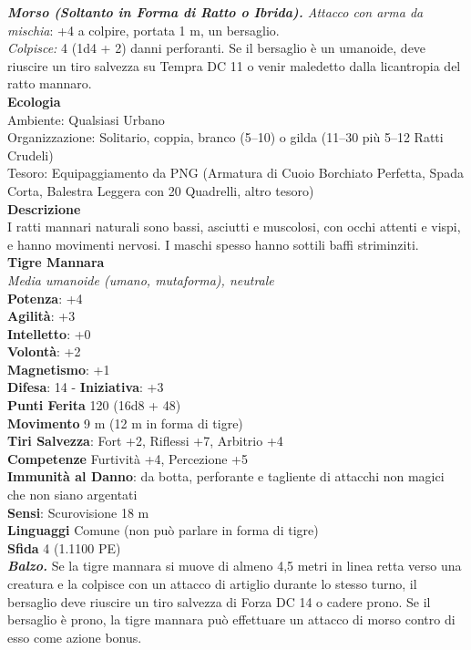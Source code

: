 \begin{multicols}{2}
\emph{\textbf{Morso (Soltanto in Forma di Ratto o Ibrida).} Attacco con arma da mischia}: +4 a colpire, portata 1 m, un bersaglio.\\

\emph{Colpisce:} 4 (1d4 + 2) danni perforanti. Se il bersaglio è un umanoide, deve riuscire un tiro salvezza su Tempra DC 11 o venir maledetto dalla licantropia del ratto mannaro.\\
\textbf{Ecologia}\\
Ambiente: Qualsiasi Urbano\\
Organizzazione: Solitario, coppia, branco (5–10) o gilda (11–30 più 5–12 Ratti Crudeli)\\
Tesoro: Equipaggiamento da PNG (Armatura di Cuoio Borchiato Perfetta, Spada Corta, Balestra Leggera con 20 Quadrelli, altro tesoro)\\
\textbf{Descrizione}\\
I ratti mannari naturali sono bassi, asciutti e muscolosi, con occhi attenti e vispi, e hanno movimenti nervosi. I maschi spesso hanno sottili baffi striminziti.\\

\medskip\textbf{Tigre Mannara}\\
\emph{Media umanoide (umano, mutaforma), neutrale}\\
\textbf{Potenza}: +4\\
\textbf{Agilità}: +3\\
\textbf{Intelletto}: +0\\
\textbf{Volontà}: +2\\
\textbf{Magnetismo}: +1\\
\textbf{Difesa}: 14 - \textbf{Iniziativa}: +3\\
\textbf{Punti Ferita} 120 (16d8 + 48)\\
\textbf{Movimento} 9 m (12 m in forma di tigre)\\
\textbf{Tiri Salvezza}: Fort +2, Riflessi +7, Arbitrio +4\\
\textbf{Competenze} Furtività +4, Percezione +5\\
\textbf{Immunità al Danno}: da botta, perforante e tagliente di attacchi non magici che non siano argentati\\
\textbf{Sensi}: Scurovisione 18 m\\
\textbf{Linguaggi} Comune (non può parlare in forma di tigre)\\
\textbf{Sfida} 4 (1.1100 PE)\smallskip\\
\emph{\textbf{Balzo.}} Se la tigre mannara si muove di almeno 4,5 metri in linea retta verso una creatura e la colpisce con un attacco di artiglio durante lo stesso turno, il bersaglio deve riuscire un tiro salvezza di Forza DC 14 o cadere prono. Se il bersaglio è prono, la tigre mannara può effettuare un attacco di morso contro di esso come azione bonus.\\


\end{multicols}

